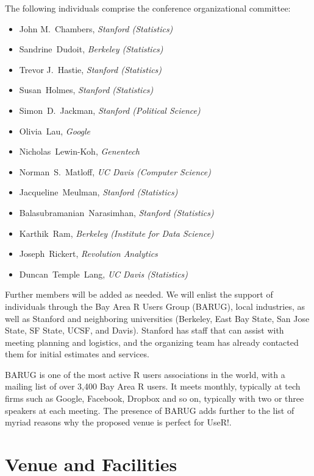 \documentclass[11pt]{article}
\begin{document}
The following individuals comprise the conference organizational
committee:
\begin{itemize}
\item John M.~Chambers, \textsl{Stanford (Statistics)}
\item Sandrine~Dudoit, \textsl{Berkeley (Statistics)}
\item Trevor J.~Hastie, \textsl{Stanford (Statistics)}
\item Susan~Holmes, \textsl{Stanford (Statistics)}
\item Simon~D.~Jackman, \textsl{Stanford (Political Science)}
\item Olivia~Lau, \textsl{Google}
\item Nicholas~Lewin-Koh, \textsl{Genentech}
\item Norman~S.~Matloff, \textsl{UC Davis (Computer Science)}
\item Jacqueline~Meulman, \textsl{Stanford (Statistics)}
\item Balasubramanian~Narasimhan, \textsl{Stanford (Statistics)}
\item Karthik~Ram, \textsl{Berkeley (Institute for Data Science)}
\item Joseph~Rickert, \textsl{Revolution Analytics}
\item Duncan~Temple~Lang, \textsl{UC Davis (Statistics)}
\end{itemize}

Further members will be added as needed. We will enlist the support
of individuals through the Bay Area R Users Group (BARUG), local
industries, as well as Stanford and neighboring universities
(Berkeley, East Bay State, San Jose State, SF State, UCSF, and Davis).
Stanford has staff that can assist with meeting planning and
logistics, and the organizing team has already contacted them for
initial estimates and services.

BARUG is one of the most active R users associations in the world,
with a mailing list of over 3,400 Bay Area R users. It meets monthly,
typically at tech firms such as Google, Facebook, Dropbox and so on,
typically with two or three speakers at each meeting.  The presence of
BARUG adds further to the list of myriad reasons why the proposed
venue is perfect for UseR!.

\section*{Venue and Facilities}
\end{document}
